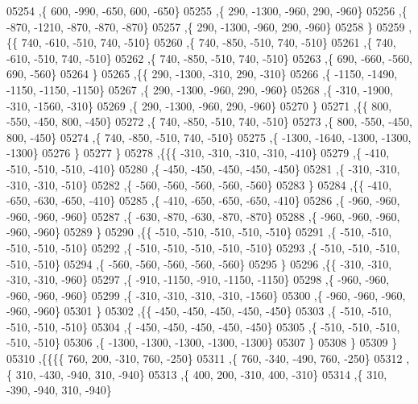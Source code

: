 \begin{DoxyCode}
05254     ,\{   600,  -990,  -650,   600,  -650\}
05255     ,\{   290, -1300,  -960,   290,  -960\}
05256     ,\{  -870, -1210,  -870,  -870,  -870\}
05257     ,\{   290, -1300,  -960,   290,  -960\}
05258     \}
05259    ,\{\{   740,  -610,  -510,   740,  -510\}
05260     ,\{   740,  -850,  -510,   740,  -510\}
05261     ,\{   740,  -610,  -510,   740,  -510\}
05262     ,\{   740,  -850,  -510,   740,  -510\}
05263     ,\{   690,  -660,  -560,   690,  -560\}
05264     \}
05265    ,\{\{   290, -1300,  -310,   290,  -310\}
05266     ,\{ -1150, -1490, -1150, -1150, -1150\}
05267     ,\{   290, -1300,  -960,   290,  -960\}
05268     ,\{  -310, -1900,  -310, -1560,  -310\}
05269     ,\{   290, -1300,  -960,   290,  -960\}
05270     \}
05271    ,\{\{   800,  -550,  -450,   800,  -450\}
05272     ,\{   740,  -850,  -510,   740,  -510\}
05273     ,\{   800,  -550,  -450,   800,  -450\}
05274     ,\{   740,  -850,  -510,   740,  -510\}
05275     ,\{ -1300, -1640, -1300, -1300, -1300\}
05276     \}
05277    \}
05278   ,\{\{\{  -310,  -310,  -310,  -310,  -410\}
05279     ,\{  -410,  -510,  -510,  -510,  -410\}
05280     ,\{  -450,  -450,  -450,  -450,  -450\}
05281     ,\{  -310,  -310,  -310,  -310,  -510\}
05282     ,\{  -560,  -560,  -560,  -560,  -560\}
05283     \}
05284    ,\{\{  -410,  -650,  -630,  -650,  -410\}
05285     ,\{  -410,  -650,  -650,  -650,  -410\}
05286     ,\{  -960,  -960,  -960,  -960,  -960\}
05287     ,\{  -630,  -870,  -630,  -870,  -870\}
05288     ,\{  -960,  -960,  -960,  -960,  -960\}
05289     \}
05290    ,\{\{  -510,  -510,  -510,  -510,  -510\}
05291     ,\{  -510,  -510,  -510,  -510,  -510\}
05292     ,\{  -510,  -510,  -510,  -510,  -510\}
05293     ,\{  -510,  -510,  -510,  -510,  -510\}
05294     ,\{  -560,  -560,  -560,  -560,  -560\}
05295     \}
05296    ,\{\{  -310,  -310,  -310,  -310,  -960\}
05297     ,\{  -910, -1150,  -910, -1150, -1150\}
05298     ,\{  -960,  -960,  -960,  -960,  -960\}
05299     ,\{  -310,  -310,  -310,  -310, -1560\}
05300     ,\{  -960,  -960,  -960,  -960,  -960\}
05301     \}
05302    ,\{\{  -450,  -450,  -450,  -450,  -450\}
05303     ,\{  -510,  -510,  -510,  -510,  -510\}
05304     ,\{  -450,  -450,  -450,  -450,  -450\}
05305     ,\{  -510,  -510,  -510,  -510,  -510\}
05306     ,\{ -1300, -1300, -1300, -1300, -1300\}
05307     \}
05308    \}
05309   \}
05310  ,\{\{\{\{   760,   200,  -310,   760,  -250\}
05311     ,\{   760,  -340,  -490,   760,  -250\}
05312     ,\{   310,  -430,  -940,   310,  -940\}
05313     ,\{   400,   200,  -310,   400,  -310\}
05314     ,\{   310,  -390,  -940,   310,  -940\}

\end{DoxyCode}
